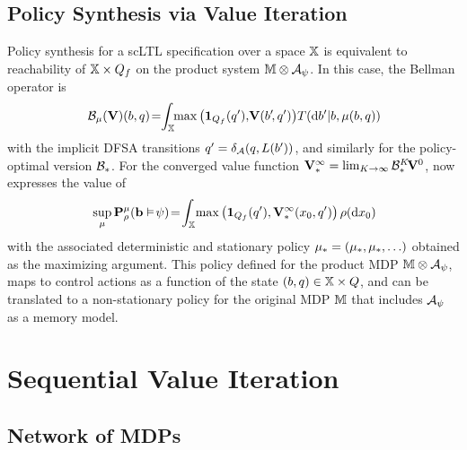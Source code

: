 \documentclass[conference]{IEEEtran}
\newcommand{\red}[1]{{\color{red} #1 }}
\begin{document}
\subsection{Policy Synthesis via Value Iteration}

Policy synthesis for a scLTL specification over a space $\mathbb{X}$ is equivalent to reachability of $\mathbb{X}\times Q_f$ on the product system $\mathbb{M} \otimes \mathcal{A}_\psi$. In this case, the Bellman operator is
\begin{equation}
\label{eq:V_recopt_inf_mu}
  \bellman_\pol (\mathbf V)(b,q)\! = \hspace{-1mm} \int_{\X} \hspace{-1mm} \max \left( \mathbf 1_{Q_f}(q'), \!\mathbf V( b'\!, q') \right)\! {\tr}(\mathrm{d} b' |b,\pol(b,q))\!
\end{equation}
with the implicit DFSA transitions  $q' =\delta_{\mathcal{A}}(q,L(b'))$, %
and similarly for the policy-optimal version $\mathcal{B}_*$.  For the converged value function $\mathbf V^\infty_* =  \lim_{K\rightarrow\infty}\mathcal{B}_*^K\! \mathbf V^0$, now expresses the value of
\begin{equation}
\label{eq:prob:_optimal} 
 \sup_{\pol}\mathbf{P}_\init^{\pol}( {\mathbf{b}} \vDash\! \psi)\! =\!
  \int_{\X} \! \max \left( \mathbf 1_{Q_f}( q'), 
   \mathbf V^\infty_*(x_0, q') \right) \init(\mathrm{d} x_0) \!
\end{equation}
with the associated deterministic and stationary policy $ \mu_*=(\mu_*,\mu_*,\ldots)$ obtained as the maximizing argument. 
This policy defined for the product MDP $\mathbb{M} \otimes \mathcal{A}_\psi$, maps to control actions as a function of the state $(b,q) \in \mathbb{X} \times Q$, and can be translated to a non-stationary policy for the original MDP $\mathbb{M}$ that includes $\mathcal{A}_\psi$ as a memory model.


\section{Sequential Value Iteration}


\subsection{Network of MDPs}
\end{document}
